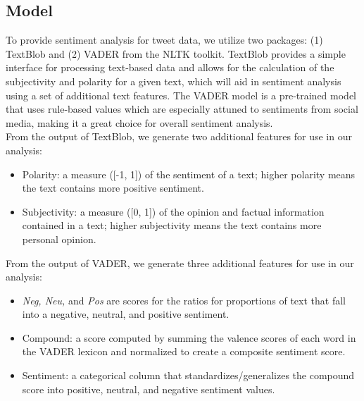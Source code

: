 \documentclass[12pt]{article}
\begin{document}
        \subsection{Model}

        To provide sentiment analysis for tweet data, we utilize two packages: (1) TextBlob and (2) VADER from the NLTK toolkit. TextBlob provides a simple interface 
        for processing text-based data and allows for the calculation of the subjectivity and polarity for a given text, which will aid in sentiment analysis using a 
        set of additional text features. The VADER model is a pre-trained model that uses rule-based values which are especially attuned to sentiments from social 
        media, making it a great choice for overall sentiment analysis. \\

        \noindent From the output of TextBlob, we generate two additional features for use in our analysis:
        \begin{itemize}
            \item Polarity: a measure ([-1, 1]) of the sentiment of a text; higher polarity means the text contains more positive sentiment.
            \item Subjectivity: a measure ([0, 1]) of the opinion and factual information contained in a text; higher subjectivity means the text contains more personal opinion.
        \end{itemize}
        
        \noindent From the output of VADER, we generate three additional features for use in our analysis:
        \begin{itemize}
            \item \textit{Neg, Neu,} and \textit{Pos} are scores for the ratios for proportions of text that fall into a negative, neutral, and positive sentiment.
            \item Compound: a score computed by summing the valence scores of each word in the VADER lexicon and normalized to create a composite sentiment score.
            \item Sentiment: a categorical column that standardizes/generalizes the compound score into positive, neutral, and negative sentiment values.
        \end{itemize}
        
\end{document}
